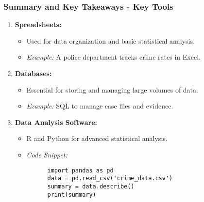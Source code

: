 \documentclass[aspectratio=169]{beamer}
\begin{document}
\begin{frame}[fragile]
  \frametitle{Summary and Key Takeaways - Key Tools}
  \begin{enumerate}
    \item \textbf{Spreadsheets:}
    \begin{itemize}
      \item Used for data organization and basic statistical analysis.
      \item \textit{Example:} A police department tracks crime rates in Excel.
    \end{itemize}

    \item \textbf{Databases:}
    \begin{itemize}
      \item Essential for storing and managing large volumes of data.
      \item \textit{Example:} SQL to manage case files and evidence.
    \end{itemize}

    \item \textbf{Data Analysis Software:}
    \begin{itemize}
      \item R and Python for advanced statistical analysis.
      \item \textit{Code Snippet:}
      \begin{lstlisting}
      import pandas as pd
      data = pd.read_csv('crime_data.csv')
      summary = data.describe()
      print(summary)
      \end{lstlisting}
    \end{itemize}
  \end{enumerate}
\end{frame}
\end{document}
